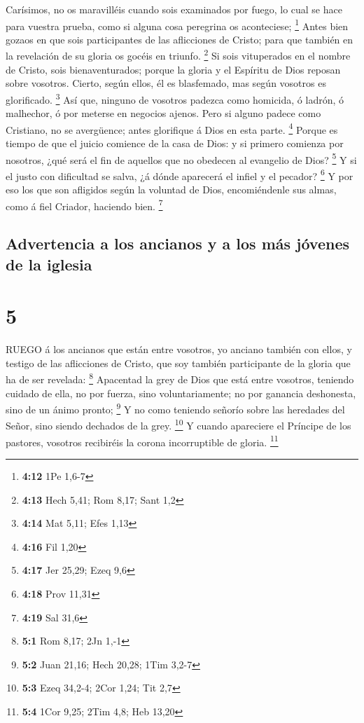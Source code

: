  Carísimos, no os maravilléis cuando sois examinados por
fuego, lo cual se hace para vuestra prueba, como si alguna cosa
peregrina os aconteciese; \footnote{\textbf{4:12} 1Pe 1,6-7}
 Antes bien gozaos en que sois participantes de las
aflicciones de Cristo; para que también en la revelación de su gloria os
gocéis en triunfo. \footnote{\textbf{4:13} Hech 5,41; Rom 8,17; Sant 1,2}
 Si sois vituperados en el nombre de Cristo, sois
bienaventurados; porque la gloria y el Espíritu de Dios reposan sobre
vosotros. Cierto, según ellos, él es blasfemado, mas según vosotros es
glorificado. \footnote{\textbf{4:14} Mat 5,11; Efes 1,13} 
Así que, ninguno de vosotros padezca como homicida, ó ladrón, ó
malhechor, ó por meterse en negocios ajenos.  Pero si
alguno padece como Cristiano, no se avergüence; antes glorifique á Dios
en esta parte. \footnote{\textbf{4:16} Fil 1,20}  Porque es
tiempo de que el juicio comience de la casa de Dios: y si primero
comienza por nosotros, ¿qué será el fin de aquellos que no obedecen al
evangelio de Dios? \footnote{\textbf{4:17} Jer 25,29; Ezeq 9,6}
 Y si el justo con dificultad se salva, ¿á dónde aparecerá
el infiel y el pecador? \footnote{\textbf{4:18} Prov 11,31}
 Y por eso los que son afligidos según la voluntad de Dios,
encomiéndenle sus almas, como á fiel Criador, haciendo bien. \footnote{\textbf{4:19}
  Sal 31,6}

\hypertarget{advertencia-a-los-ancianos-y-a-los-muxe1s-juxf3venes-de-la-iglesia}{%
\subsection{Advertencia a los ancianos y a los más jóvenes de la
iglesia}\label{advertencia-a-los-ancianos-y-a-los-muxe1s-juxf3venes-de-la-iglesia}}

\hypertarget{section-4}{%
\section{5}\label{section-4}}

 RUEGO á los ancianos que están entre vosotros, yo anciano
también con ellos, y testigo de las aflicciones de Cristo, que soy
también participante de la gloria que ha de ser revelada: \footnote{\textbf{5:1}
  Rom 8,17; 2Jn 1,-1}  Apacentad la grey de Dios que está
entre vosotros, teniendo cuidado de ella, no por fuerza, sino
voluntariamente; no por ganancia deshonesta, sino de un ánimo pronto;
\footnote{\textbf{5:2} Juan 21,16; Hech 20,28; 1Tim 3,2-7} 
Y no como teniendo señorío sobre las heredades del Señor, sino siendo
dechados de la grey. \footnote{\textbf{5:3} Ezeq 34,2-4; 2Cor 1,24; Tit
  2,7}  Y cuando apareciere el Príncipe de los pastores,
vosotros recibiréis la corona incorruptible de gloria. \footnote{\textbf{5:4}
  1Cor 9,25; 2Tim 4,8; Heb 13,20}

